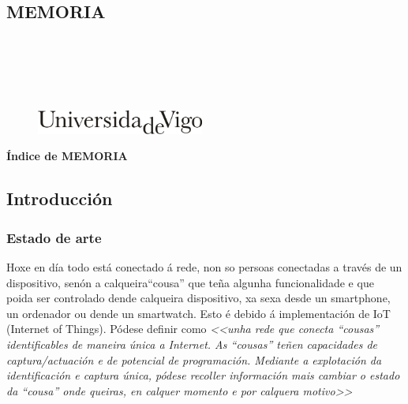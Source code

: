 \documentclass[11pt,twoside]{book}
\begin{document}
\begin{center}
\begin{normalsize}
\begin{center}
\part{\bf{MEMORIA}}
\end{center}
\end{normalsize}
\ \\
\ \\
\ \\
\ \\

\begin{center}
\begin{figure}[htbp]
\begin{center}
\includegraphics[angle=0, height=0.8cm]{images/UVIGOLogo.png}
\end{center}
\end{figure}
\end{center}

\end{center}

\cleardoublepage


\pagestyle{fancy}

\startcontents[parts]
\begin{center}{\large \bf Índice de MEMORIA}\end{center}

{\hypersetup{hidelinks}}

\cleardoublepage%

\chapter{Introducción}

\section{Estado de arte}

Hoxe en día todo está conectado á rede, non so persoas conectadas a través de un dispositivo, senón a calqueira``cousa'' que teña algunha funcionalidade e que poida ser controlado dende calqueira dispositivo, xa sexa desde un smartphone, un ordenador ou dende un smartwatch. Esto é debido á implementación de IoT (Internet of Things). Pódese definir como \textit{<<unha rede que conecta ``cousas'' identificables de maneira única a Internet. As ``cousas'' teñen capacidades de captura/actuación e de potencial de programación. Mediante a explotación  da identificación e captura única, pódese recoller información mais cambiar o estado da ``cousa'' onde queiras, en calquer momento e por calquera motivo>>} \cite{IoT}
\end{document}
